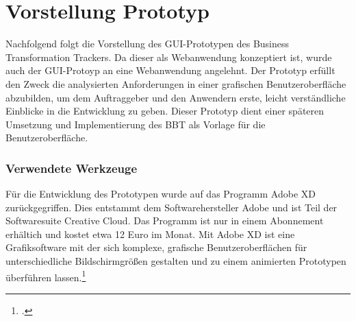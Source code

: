 \section{Vorstellung Prototyp}
Nachfolgend folgt die Vorstellung des GUI-Prototypen des Business Transformation Trackers. Da dieser als Webanwendung konzeptiert ist, wurde auch der GUI-Protoyp an eine Webanwendung angelehnt. Der Prototyp erfüllt den Zweck die analysierten Anforderungen in einer grafischen Benutzeroberfläche abzubilden, um dem Auftraggeber und den Anwendern erste, leicht verständliche Einblicke in die Entwicklung zu geben. Dieser Prototyp dient einer späteren Umsetzung und Implementierung des BBT als Vorlage für die Benutzeroberfläche.

\subsubsection{Verwendete Werkzeuge}
Für die Entwicklung des Prototypen wurde auf das Programm Adobe XD zurückgegriffen. Dies entstammt dem Softwarehersteller Adobe und ist Teil der Softwaresuite \glqq{}Creative Cloud\grqq{}. Das Programm ist nur in einem Abonnement erhältich und kostet etwa 12 Euro im Monat. Mit Adobe XD ist eine Grafiksoftware mit der sich komplexe, grafische Benutzeroberflächen für unterschiedliche Bildschirmgrößen gestalten und zu einem animierten Prototypen überführen lassen.\footcite[Vgl.][]{adobe}



